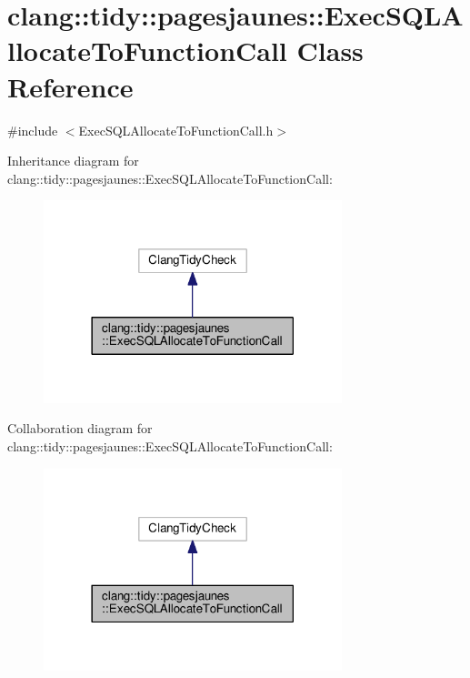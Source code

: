 \hypertarget{classclang_1_1tidy_1_1pagesjaunes_1_1_exec_s_q_l_allocate_to_function_call}{}\section{clang\+:\+:tidy\+:\+:pagesjaunes\+:\+:Exec\+S\+Q\+L\+Allocate\+To\+Function\+Call Class Reference}
\label{classclang_1_1tidy_1_1pagesjaunes_1_1_exec_s_q_l_allocate_to_function_call}


{\ttfamily \#include $<$Exec\+S\+Q\+L\+Allocate\+To\+Function\+Call.\+h$>$}



Inheritance diagram for clang\+:\+:tidy\+:\+:pagesjaunes\+:\+:Exec\+S\+Q\+L\+Allocate\+To\+Function\+Call\+:
\nopagebreak
\begin{figure}[H]
\begin{center}
\leavevmode
\includegraphics[width=246pt]{classclang_1_1tidy_1_1pagesjaunes_1_1_exec_s_q_l_allocate_to_function_call__inherit__graph}
\end{center}
\end{figure}


Collaboration diagram for clang\+:\+:tidy\+:\+:pagesjaunes\+:\+:Exec\+S\+Q\+L\+Allocate\+To\+Function\+Call\+:
\nopagebreak
\begin{figure}[H]
\begin{center}
\leavevmode
\includegraphics[width=246pt]{classclang_1_1tidy_1_1pagesjaunes_1_1_exec_s_q_l_allocate_to_function_call__coll__graph}
\end{center}
\end{figure}
